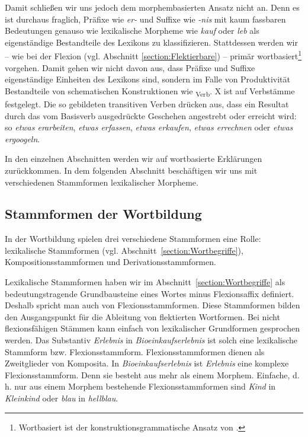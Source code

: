 Damit schließen wir uns jedoch dem morphembasierten Ansatz nicht an. Denn es ist durchaus fraglich, Präfixe wie \textit{er-} und Suffixe wie \textit{-nis} mit kaum fassbaren Bedeutungen genauso wie lexikalische Morpheme wie \textit{kauf} oder \textit{leb} als eigenständige Bestandteile des Lexikons zu klassifizieren. Stattdessen werden wir -- wie bei der Flexion (vgl. Abschnitt \ref{section:Flektierbare}) -- primär wortbasiert\footnote{Wortbasiert ist \zB der konstruktionsgrammatische Ansatz von \citet{Booij2010}.} vorgehen. Damit gehen wir nicht davon aus, dass Präfixe und Suffixe eigenständige Einheiten des Lexikons sind, sondern im Falle von Produktivität Bestandteile von schematischen Konstruktionen wie \zB [er-X]\textsubscript{Verb}. X ist auf Verbstämme festgelegt. Die so gebildeten transitiven Verben drücken aus, dass ein Resultat durch das vom Basisverb ausgedrückte Geschehen angestrebt oder erreicht wird: so \zB \textit{etwas erarbeiten}, \textit{etwas erfassen}, \textit{etwas erkaufen}, \textit{etwas errechnen} oder \textit{etwas ergoogeln}.

In den einzelnen Abschnitten werden wir auf wortbasierte Erklärungen zurückkommen. In dem folgenden Abschnitt beschäftigen wir uns mit verschiedenen Stammformen lexikalischer Morpheme.


\subsection{Stammformen der Wortbildung}\label{subsection:Stämme}

In der Wortbildung spielen drei verschiedene Stammformen eine Rolle: lexikalische Stammformen (vgl. Abschnitt~\ref{section:Wortbegriffe}), Kompositionsstammformen und Derivationsstammformen. 

Lexikalische Stammformen haben wir im Abschnitt~\ref{section:Wortbegriffe} als bedeutungstragende Grundbausteine eines Wortes minus Flexionsaffix definiert. Deshalb spricht man auch von Flexionsstammformen. Diese Stammformen bilden den Ausgangspunkt für die Ableitung von flektierten Wortformen. Bei nicht flexionsfähigen Stämmen kann einfach von lexikalischer Grundformen gesprochen werden. Das Substantiv \textit{Erlebnis} in \textit{Bioeinkaufserlebnis} ist solch eine lexikalische Stammform bzw. Flexionsstammform. Flexionsstammformen dienen als Zweitglieder von Komposita. In \textit{Bioeinkaufserlebnis} ist \textit{Erlebnis} eine komplexe Flexionsstammform. Denn sie besteht aus mehr als einem Morphem. Einfache, d.\,h. nur aus einem Morphem bestehende Flexionsstammformen sind \textit{Kind} in \textit{Kleinkind} oder \textit{blau} in \textit{hellblau}.

